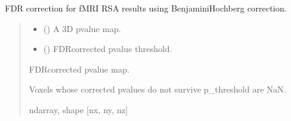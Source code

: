 \documentclass[letterpaper,10pt,english]{sphinxhowto}
\begin{document}

\begin{fulllineitems}
\label{\detokenize{stuff:neurora.stuff.fdr_correct}}
\pysigstartsignatures
{}
\pysigstopsignatures
\sphinxAtStartPar
FDR correction for fMRI RSA results using Benjamini\sphinxhyphen{}Hochberg correction.
\begin{quote}\begin{description}
\begin{itemize}
\item {} 
\sphinxAtStartPar
{} (\sphinxstyleliteralemphasis{\sphinxupquote{, }}\sphinxstyleliteralemphasis{\sphinxupquote{ {[}}}\sphinxstyleliteralemphasis{\sphinxupquote{, }}\sphinxstyleliteralemphasis{\sphinxupquote{, }}\sphinxstyleliteralemphasis{\sphinxupquote{{]}}}) \textendash{} A 3\sphinxhyphen{}D p\sphinxhyphen{}value map.

\item {} 
\sphinxAtStartPar
{} () \textendash{} FDR\sphinxhyphen{}corrected p\sphinxhyphen{}value threshold.

\end{itemize}

\sphinxAtStartPar

\sphinxAtStartPar
{} \textendash{} FDR\sphinxhyphen{}corrected p\sphinxhyphen{}value map.

\sphinxAtStartPar
Voxels whose corrected p\sphinxhyphen{}values do not survive p\_threshold are NaN.


\sphinxAtStartPar
ndarray, shape {[}nx, ny, nz{]}

\end{description}\end{quote}

\end{fulllineitems}
\end{document}
